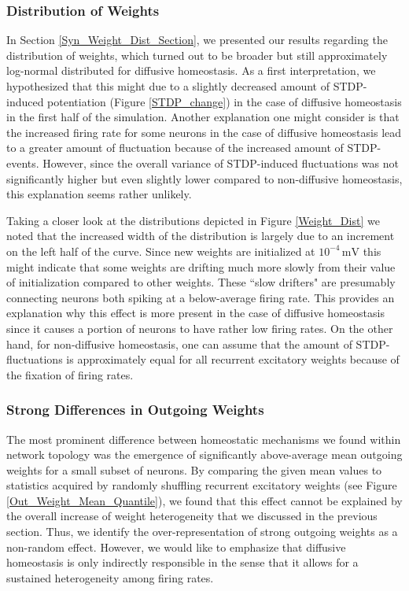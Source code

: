 \documentclass[10pt,a4paper]{article}
\begin{document}
\subsubsection{Distribution of Weights}
In Section \ref{Syn_Weight_Dist_Section}, we presented our results regarding the distribution of weights, which turned out to be broader but still approximately log-normal distributed for diffusive homeostasis. As a first interpretation, we hypothesized that this might due to a slightly decreased amount of STDP-induced potentiation (Figure \ref{STDP_change}) in the case of diffusive homeostasis in the first half of the simulation. Another explanation one might consider is that the increased firing rate for some neurons in the case of diffusive homeostasis lead to a greater amount of fluctuation because of the increased amount of STDP-events. However, since the overall variance of STDP-induced fluctuations was not significantly higher but even slightly lower compared to non-diffusive homeostasis, this explanation seems rather unlikely. 

Taking a closer look at the distributions depicted in Figure \ref{Weight_Dist} we noted that the increased width of the distribution is largely due to an increment on the left half of the curve. Since new weights are initialized at $\mathrm{10^{-4}\, mV}$ this might indicate that some weights are drifting much more slowly from their value of initialization compared to other weights. These ``slow drifters" are presumably connecting neurons both spiking at a below-average firing rate.
This provides an explanation why this effect is more present in the case of diffusive homeostasis since it causes a portion of neurons to have rather low firing rates. On the other hand, for non-diffusive homeostasis, one can assume that the amount of STDP-fluctuations is approximately equal for all recurrent excitatory weights because of the fixation of firing rates.

\subsubsection{Strong Differences in Outgoing Weights}
The most prominent difference between homeostatic mechanisms we found within network topology was the emergence of significantly above-average mean outgoing weights for a small subset of neurons. By comparing the given mean values to statistics acquired by randomly shuffling recurrent excitatory weights (see Figure \ref{Out_Weight_Mean_Quantile}), we found that this effect cannot be explained by the overall increase of weight heterogeneity that we discussed in the previous section. Thus, we identify the over-representation of strong outgoing weights as a non-random effect. However, we would like to emphasize that diffusive homeostasis is only indirectly responsible in the sense that it allows for a sustained heterogeneity among firing rates.   
\end{document}
